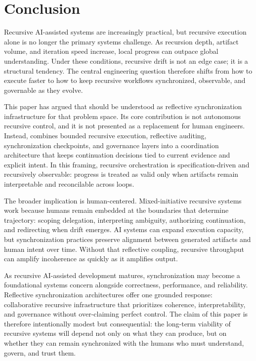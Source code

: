 \section{Conclusion}
\label{sec:conclusion}

Recursive AI-assisted systems are increasingly practical, but recursive execution alone is no longer the primary systems challenge. As recursion depth, artifact volume, and iteration speed increase, local progress can outpace global understanding. Under these conditions, recursive drift is not an edge case; it is a structural tendency. The central engineering question therefore shifts from how to execute faster to how to keep recursive workflows synchronized, observable, and governable as they evolve.

This paper has argued that  should be understood as reflective synchronization infrastructure for that problem space. Its core contribution is not autonomous recursive control, and it is not presented as a replacement for human engineers. Instead,  combines bounded recursive execution, reflective auditing, synchronization checkpoints, and governance layers into a coordination architecture that keeps continuation decisions tied to current evidence and explicit intent. In this framing, recursive orchestration is specification-driven and recursively observable: progress is treated as valid only when artifacts remain interpretable and reconcilable across loops.

The broader implication is human-centered. Mixed-initiative recursive systems work because humans remain embedded at the boundaries that determine trajectory: scoping delegation, interpreting ambiguity, authorizing continuation, and redirecting when drift emerges. AI systems can expand execution capacity, but synchronization practices preserve alignment between generated artifacts and human intent over time. Without that reflective coupling, recursive throughput can amplify incoherence as quickly as it amplifies output.

As recursive AI-assisted development matures, synchronization may become a foundational systems concern alongside correctness, performance, and reliability. Reflective synchronization architectures offer one grounded response: collaborative recursive infrastructure that prioritizes coherence, interpretability, and governance without over-claiming perfect control. The claim of this paper is therefore intentionally modest but consequential: the long-term viability of recursive systems will depend not only on what they can produce, but on whether they can remain synchronized with the humans who must understand, govern, and trust them.
